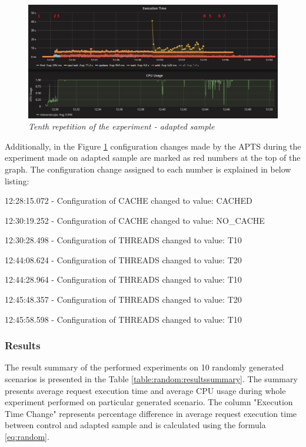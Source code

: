 \documentclass[12pt,a4paper]{article}
\let\tmpone\enumerate
\let\tmptwo\endenumerate
\renewenvironment{enumerate}{\tmpone\addtolength{\itemsep}{-0.4\baselineskip}}{\tmptwo}
\begin{document}
\begin{figure}[!htb]
\centering
\includegraphics[width=1\textwidth]{10-adap}
\caption{\textit{Tenth repetition of the experiment - adapted sample}} \label{figure:random:screen:adapted:10}
\end{figure}

Additionally, in the Figure \ref{figure:random:screen:adapted:10} configuration changes made by the APTS during the experiment made on adapted sample are marked as red numbers at the top of the graph. The configuration change assigned to each number is explained in below listing: 

\begin{enumerate}
\item 12:28:15.072 - Configuration of CACHE changed to value: CACHED
\item 12:30:19.252 - Configuration of CACHE changed to value: NO\_CACHE
\item 12:30:28.498 - Configuration of THREADS changed to value: T10
\item 12:44:08.624 - Configuration of THREADS changed to value: T20
\item 12:44:28.964 - Configuration of THREADS changed to value: T10
\item 12:45:48.357 - Configuration of THREADS changed to value: T20
\item 12:45:58.598 - Configuration of THREADS changed to value: T10
\end{enumerate}

\subsubsection{Results} 

The result summary of the performed experiments on 10 randomly generated scenarios is presented in the Table \ref{table:random:resultssummary}. The summary presents average request execution time and average CPU usage during whole experiment performed on particular generated scenario. The column "Execution Time Change" represents percentage difference in average request execution time between control and adapted sample and is calculated using the formula \eqref{eq:random}.
\end{document}

